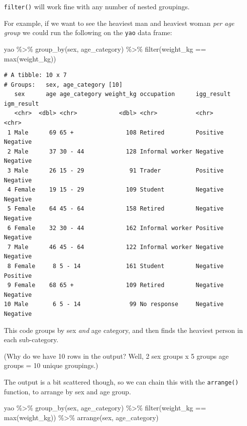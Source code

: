\documentclass[
  letterpaper,
  DIV=11,
  numbers=noendperiod]{scrreprt}
\newenvironment{Shaded}{\begin{snugshade}}{\end{snugshade}}
\newcommand{\FunctionTok}[1]{\textcolor[rgb]{0.28,0.35,0.67}{#1}}
\newcommand{\NormalTok}[1]{\textcolor[rgb]{0.00,0.23,0.31}{#1}}
\newcommand{\SpecialCharTok}[1]{\textcolor[rgb]{0.37,0.37,0.37}{#1}}
\begin{document}
\texttt{filter()} will work fine with any number of nested groupings.

For example, if we want to see the heaviest man and heaviest woman
\emph{per age group} we could run the following on the \texttt{yao} data
frame:

\begin{Shaded}
\begin{Highlighting}[]
\NormalTok{yao }\SpecialCharTok{\%\textgreater{}\%} 
  \FunctionTok{group\_by}\NormalTok{(sex, age\_category) }\SpecialCharTok{\%\textgreater{}\%} 
  \FunctionTok{filter}\NormalTok{(weight\_kg }\SpecialCharTok{==} \FunctionTok{max}\NormalTok{(weight\_kg))}
\end{Highlighting}
\end{Shaded}

\begin{verbatim}
# A tibble: 10 x 7
# Groups:   sex, age_category [10]
   sex      age age_category weight_kg occupation      igg_result igm_result
   <chr>  <dbl> <chr>            <dbl> <chr>           <chr>      <chr>     
 1 Male      69 65 +               108 Retired         Positive   Negative  
 2 Male      37 30 - 44            128 Informal worker Negative   Negative  
 3 Male      26 15 - 29             91 Trader          Positive   Negative  
 4 Female    19 15 - 29            109 Student         Negative   Negative  
 5 Female    64 45 - 64            158 Retired         Negative   Negative  
 6 Female    32 30 - 44            162 Informal worker Positive   Negative  
 7 Male      46 45 - 64            122 Informal worker Negative   Negative  
 8 Female     8 5 - 14             161 Student         Negative   Positive  
 9 Female    68 65 +               109 Retired         Negative   Negative  
10 Male       6 5 - 14              99 No response     Negative   Negative  
\end{verbatim}

This code groups by sex \emph{and} age category, and then finds the
heaviest person in each sub-category.

(Why do we have 10 rows in the output? Well, 2 sex groups x 5 groups age
groups = 10 unique groupings.)

The output is a bit scattered though, so we can chain this with the
\texttt{arrange()} function, to arrange by sex and age group.

\begin{Shaded}
\begin{Highlighting}[]
\NormalTok{yao }\SpecialCharTok{\%\textgreater{}\%} 
  \FunctionTok{group\_by}\NormalTok{(sex, age\_category) }\SpecialCharTok{\%\textgreater{}\%} 
  \FunctionTok{filter}\NormalTok{(weight\_kg }\SpecialCharTok{==} \FunctionTok{max}\NormalTok{(weight\_kg)) }\SpecialCharTok{\%\textgreater{}\%} 
  \FunctionTok{arrange}\NormalTok{(sex, age\_category)}
\end{Highlighting}
\end{Shaded}
\end{document}

